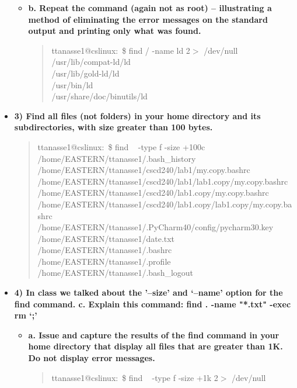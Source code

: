 \documentclass{article}
\begin{document}
\begin{itemize}
\begin{itemize}
\begin{quote}
    \end{quote}
    \item \textbf{b. Repeat the command (again not as root) – illustrating a method of eliminating the error messages on the standard output and printing only what was found. }
    \begin{quote}
      ttanasse1@cslinux:~\$ find / -name ld 2$>$ /dev/null\\
/usr/lib/compat-ld/ld\\
/usr/lib/gold-ld/ld\\
/usr/bin/ld\\
/usr/share/doc/binutils/ld

    \end{quote}
  \end{itemize}
  \item \textbf{3) Find all files (not folders) in your home directory and its subdirectories, with size greater than 100 bytes.}
  \begin{quote}
    ttanasse1@cslinux:~\$ find ~ -type f -size +100c\\
/home/EASTERN/ttanasse1/.bash\_history\\
/home/EASTERN/ttanasse1/cscd240/lab1/my.copy.bashrc\\
/home/EASTERN/ttanasse1/cscd240/lab1/lab1.copy/my.copy.bashrc\\
/home/EASTERN/ttanasse1/cscd240/lab1.copy/my.copy.bashrc\\
/home/EASTERN/ttanasse1/cscd240/lab1.copy/lab1.copy/my.copy.bashrc\\
/home/EASTERN/ttanasse1/.PyCharm40/config/pycharm30.key\\
/home/EASTERN/ttanasse1/date.txt\\
/home/EASTERN/ttanasse1/.bashrc\\
/home/EASTERN/ttanasse1/.profile\\
/home/EASTERN/ttanasse1/.bash\_logout
  \end{quote}
  \item \textbf{4) In class we talked about the '–size' and ‘–name’ option for the find command.
c. Explain this command: find . -name "*.txt" -exec  rm  {}   ‘;’}
  \begin{itemize}
    \item \textbf{a. Issue and capture the results of the find command in your home directory that display all files that are greater than 1K.  Do not display error messages.}
    \begin{quote}
      ttanasse1@cslinux:~\$ find ~ -type f -size +1k 2$>$ /dev/null\\

\end{quote}
\end{itemize}
\end{itemize}
\end{document}
